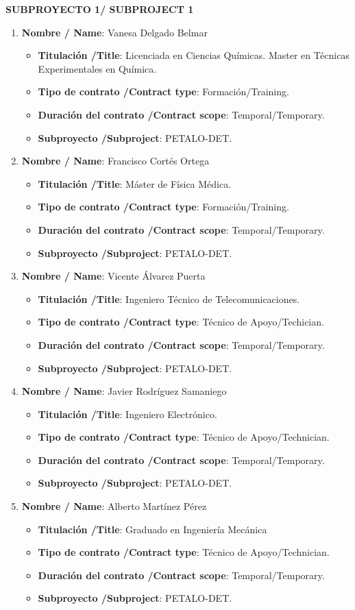 \noindent\textbf{SUBPROYECTO 1/ SUBPROJECT 1}
\begin{enumerate}
\item {\bf Nombre / Name}: Vanesa Delgado Belmar
\begin{itemize}
\item {\bf Titulación /Title}:  Licenciada en Ciencias Químicas. Master en Técnicas Experimentales en Química.
\item {\bf Tipo de contrato /Contract type}: Formación/Training. 
\item {\bf Duración del contrato /Contract scope}: Temporal/Temporary. 
\item {\bf Subproyecto /Subproject}: PETALO-DET. 
\end{itemize}
\item {\bf Nombre / Name}: Francisco Cortés Ortega
\begin{itemize}
\item {\bf Titulación /Title}: Máster de Física Médica. 
\item {\bf Tipo de contrato /Contract type}: Formación/Training. 
\item {\bf Duración del contrato /Contract scope}: Temporal/Temporary. 
\item {\bf Subproyecto /Subproject}: PETALO-DET. 
\end{itemize}
\item {\bf Nombre / Name}: Vicente Álvarez Puerta
\begin{itemize}
\item {\bf Titulación /Title}: Ingeniero Técnico de Telecomunicaciones. 
\item {\bf Tipo de contrato /Contract type}: Técnico de Apoyo/Techician. 
\item {\bf Duración del contrato /Contract scope}: Temporal/Temporary. 
\item {\bf Subproyecto /Subproject}: PETALO-DET. 
\end{itemize}
\item {\bf Nombre / Name}: Javier Rodríguez Samaniego
\begin{itemize}
\item {\bf Titulación /Title}: Ingeniero Electrónico. 
\item {\bf Tipo de contrato /Contract type}: Técnico de Apoyo/Technician. 
\item {\bf Duración del contrato /Contract scope}: Temporal/Temporary. 
\item {\bf Subproyecto /Subproject}: PETALO-DET. 
\end{itemize}
\item {\bf Nombre / Name}: Alberto Martínez Pérez
\begin{itemize}
\item {\bf Titulación /Title}: Graduado en Ingeniería Mecánica 
\item {\bf Tipo de contrato /Contract type}: Técnico de Apoyo/Technician.
\item {\bf Duración del contrato /Contract scope}: Temporal/Temporary. 
\item {\bf Subproyecto /Subproject}: PETALO-DET. 
\end{itemize}

\end{enumerate}

